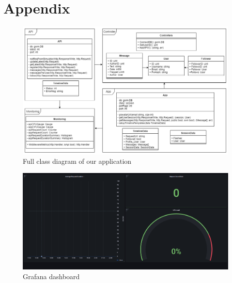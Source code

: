 \section{Appendix}

\appendix

\begin{figure}[H]
    \centering
    \label{appendix:CCDiagram}
    \includegraphics[scale=0.43]{images/full_class_overview.png}
    \caption{Full class diagram of our application}
\end{figure}

\begin{figure}[H]
    \centering
    \label{appendix:dashboard}
    \includegraphics[scale=0.32]{images/Grafana dashboard.PNG}
    \caption{Grafana dashboard}
\end{figure}